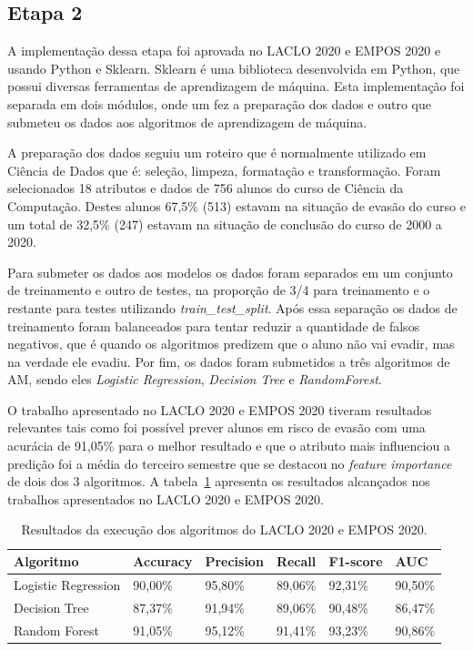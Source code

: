 \documentclass[diss,capa]{texufpel}
\begin{document}
\subsection{Etapa 2}
\label{subsec:etapa2}

A implementação dessa etapa foi aprovada no LACLO 2020 e EMPOS 2020 e usando Python e Sklearn. Sklearn é uma biblioteca desenvolvida em Python, que possui diversas ferramentas de aprendizagem de máquina. Esta implementação foi separada em dois módulos, onde um fez a preparação dos dados e outro que submeteu os dados aos algoritmos de aprendizagem de máquina.

A preparação dos dados seguiu um roteiro que é normalmente utilizado em Ciência de Dados que é: seleção, limpeza, formatação e transformação. Foram selecionados 18 atributos e dados de 756 alunos do curso de Ciência da Computação. Destes alunos 67,5\% (513) estavam na situação de evasão do curso e um total de 32,5\% (247) estavam na situação de conclusão do curso de 2000 a 2020.

Para submeter os dados aos modelos os dados foram separados em um conjunto de treinamento e outro de testes, na proporção  de  3/4  para  treinamento  e o  restante  para  testes  utilizando \textit{train\_test\_split}.  Após  essa separação os dados de treinamento foram balanceados para tentar reduzir a quantidade de falsos negativos, que é quando os  algoritmos  predizem  que  o  aluno  não  vai  evadir,  mas na verdade ele evadiu.  Por  fim,  os  dados  foram submetidos a três algoritmos de AM, sendo eles \textit{Logistic Regression}, \textit{Decision Tree} e \textit{RandomForest}.

O trabalho apresentado no LACLO 2020 e EMPOS 2020 tiveram resultados relevantes tais como foi possível prever alunos em risco de evasão com uma acurácia de 91,05\% para o melhor resultado e que o atributo mais influenciou a predição foi a média do terceiro semestre que se destacou no \textit{feature importance} de dois dos 3 algoritmos. A tabela~\ref{tab:resultados-algoritmos-laclo-empos} apresenta os resultados alcançados nos trabalhos apresentados no LACLO 2020 e EMPOS 2020.

\begin{table}[htbp]
\footnotesize\addtolength{\tabcolsep}{-4pt}
\begin{center}
\caption{Resultados da execução dos algoritmos do LACLO 2020 e EMPOS 2020.}
\label{tab:resultados-algoritmos-laclo-empos}
\begin{tabular}{p{4cm}p{2cm}p{2cm}p{2cm}p{2cm}p{2cm}} \hline
Algoritmo           & Accuracy & Precision & Recall  & F1-score & AUC     \\ \hline
Logistic Regression & 90,00\%  & 95,80\%   & 89,06\% & 92,31\%  & 90,50\% \\
Decision Tree       & 87,37\%  & 91,94\%   & 89,06\% & 90,48\%  & 86,47\% \\
Random Forest       & 91,05\%  & 95,12\%   & 91,41\% & 93,23\%  & 90,86\% \\ \hline
\end{tabular}
\end{center}
\end{table}
\end{document}
